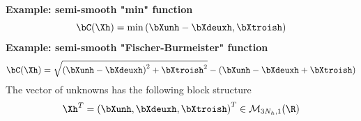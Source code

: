 \documentclass[10 pt]{beamer}
\begin{document}
\begin{frame}
%
\textcolor{cadmiumgreen}{\textbf{ Example: semi-smooth "min" function}} 
\begin{equation*}
\bC(\Xh) =\min \left(\bXunh-\bXdeuxh, \bXtroish\right)
\end{equation*}
\textcolor{cadmiumgreen}{\textbf{Example: semi-smooth "Fischer-Burmeister" function}}
\begin{equation*}
\bC(\Xh)=\sqrt{\left(\bXunh-\bXdeuxh\right)^2 + \bXtroish^2} - (\bXunh-\bXdeuxh + \bXtroish)
\end{equation*}
The vector of unknowns has the following block structure
\begin{equation*}
\Xh^{T}=
\left(\bXunh, \bXdeuxh, \bXtroish\right)^{T} \in \mathcal{M}_{3N_h,1}(\R)
\end{equation*}
\end{frame}
\end{document}
